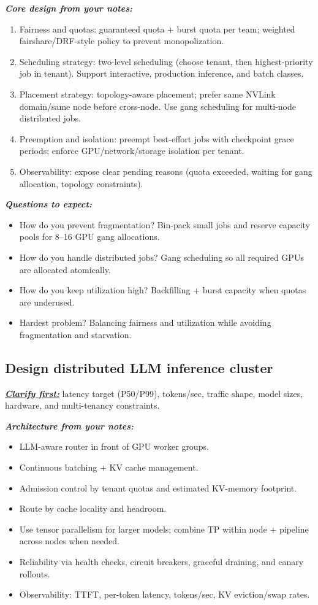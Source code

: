 \documentclass[12pt]{article}
\newcommand{\keysent}[1]{\textbf{\textit{\uline{#1}}}}
\let\origtextbf\textbf
\renewcommand{\textbf}[1]{\origtextbf{\textit{#1}}}
\begin{document}
\textbf{Core design from your notes:}
\begin{enumerate}[leftmargin=1.3em]
\item Fairness and quotas: guaranteed quota + burst quota per team; weighted fairshare/DRF-style policy to prevent monopolization.
\item Scheduling strategy: two-level scheduling (choose tenant, then highest-priority job in tenant). Support interactive, production inference, and batch classes.
\item Placement strategy: topology-aware placement; prefer same NVLink domain/same node before cross-node. Use gang scheduling for multi-node distributed jobs.
\item Preemption and isolation: preempt best-effort jobs with checkpoint grace periods; enforce GPU/network/storage isolation per tenant.
\item Observability: expose clear pending reasons (quota exceeded, waiting for gang allocation, topology constraints).
\end{enumerate}

\textbf{Questions to expect:}
\begin{itemize}
\item How do you prevent fragmentation? Bin-pack small jobs and reserve capacity pools for 8--16 GPU gang allocations.
\item How do you handle distributed jobs? Gang scheduling so all required GPUs are allocated atomically.
\item How do you keep utilization high? Backfilling + burst capacity when quotas are underused.
\item Hardest problem? Balancing fairness and utilization while avoiding fragmentation and starvation.
\end{itemize}

\subsection{Design distributed LLM inference cluster}
\keysent{Clarify first:} latency target (P50/P99), tokens/sec, traffic shape, model sizes, hardware, and multi-tenancy constraints.

\textbf{Architecture from your notes:}
\begin{itemize}
\item LLM-aware router in front of GPU worker groups.
\item Continuous batching + KV cache management.
\item Admission control by tenant quotas and estimated KV-memory footprint.
\item Route by cache locality and headroom.
\item Use tensor parallelism for larger models; combine TP within node + pipeline across nodes when needed.
\item Reliability via health checks, circuit breakers, graceful draining, and canary rollouts.
\item Observability: TTFT, per-token latency, tokens/sec, KV eviction/swap rates.
\end{itemize}
\end{document}
